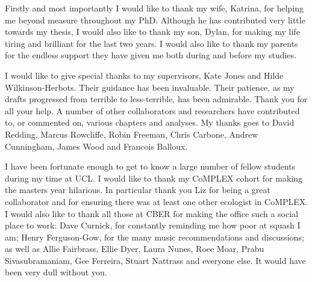 \begin{acknowledgements}



Firstly and most importantly I would like to thank my wife, Katrina, for helping me beyond measure throughout my PhD.
Although he has contributed very little towards my thesis, I would also like to thank my son, Dylan, for making my life tiring and brilliant for the last two years.
I would also like to thank my parents for the endless support they have given me both during and before my studies.



I would like to give special thanks to my supervisors, Kate Jones and Hilde Wilkinson-Herbots.
Their guidance has been invaluable.
Their patience, as my drafts progressed from terrible to less-terrible, has been admirable.
Thank you for all your help.
A number of other collaborators and researchers have contributed to, or commented on, various chapters and analyses.
My thanks goes to David Redding, Marcus Rowcliffe, Robin Freeman, Chris Carbone, Andrew Cunningham, James Wood and Francois Balloux.


I have been fortunate enough to get to know a large number of fellow students during my time at UCL.
I would like to thank my CoMPLEX cohort for making the masters year hilarious.
In particular thank you Liz for being a great collaborator and for ensuring there was at least one other ecologist in CoMPLEX.
I would also like to thank all those at CBER for making the office such a social place to work: Dave Curnick, for constantly reminding me how poor at squash I am; Henry Ferguson-Gow, for the many music recommendations and discussions; as well as Allie Fairbrass, Ellie Dyer, Laura Nunes, Roee Moar, Prabu Sivasubramaniam, Gee Ferreira, Stuart Nattrass and everyone else.
It would have been very dull without you.


\end{acknowledgements}

\setcounter{tocdepth}{2} 

\tableofcontents
\listoffigures
\listoftables

